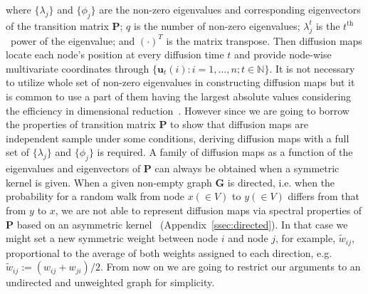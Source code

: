\documentclass[11pt]{article}
\theoremstyle{definition}
\begin{document}
where $\{ \lambda_{j} \}$ and $\{ \phi_{j}  \}$ are the non-zero eigenvalues and corresponding eigenvectors of the transition matrix $\mathbf{P}$; $q$ is the number of non-zero eigenvalues; $\lambda^{t}_{j}$ is the $t^{\mbox{th}}$~power of the eigenvalue; and $(\cdot)^{T}$ is the matrix transpose. Then diffusion maps locate each node's position at every diffusion time $t$ and provide node-wise multivariate coordinates through $\{\mathbf{u}_{t}(i) : i = 1, \ldots, n;  t  \in \mathbb{N} \}$. It is not necessary to utilize whole set of non-zero eigenvalues in constructing diffusion maps but it is common to use a part of them having the largest absolute values considering the efficiency in dimensional reduction~\cite{coifman2006diffusion}. However since we are going to borrow the properties of transition matrix $\mathbf{P}$ to show that diffusion maps are independent sample under some conditions, deriving diffusion maps with a full set of $\{ \lambda_{j} \}$ and $\{ \phi_{j}  \}$ is required. A family of diffusion maps as a function of the eigenvalues and eigenvectors of $\mathbf{P}$ can always be obtained when a symmetric kernel is given. When a given non-empty graph $\mathbf{G}$ is directed, i.e. when the probability for a random walk from node $x (\in V)$ to $y (\in V)$ differs from that from $y$ to $x$, we are not able to represent diffusion maps via spectral properties of $\mathbf{P}$ based on an asymmetric kernel~\cite{tang2010graph} (Appendix~\ref{ssec:directed}). In that case we might set a new symmetric weight between node $i$ and node $j$, for example, $\tilde{w}_{ij}$, proportional to the average of both weights assigned to each direction, e.g. $\tilde{w}_{ij} := (w_{ij} + w_{ji} ) / 2$. From now on we are going to restrict our arguments to an undirected and unweighted graph for simplicity.
\end{document}
